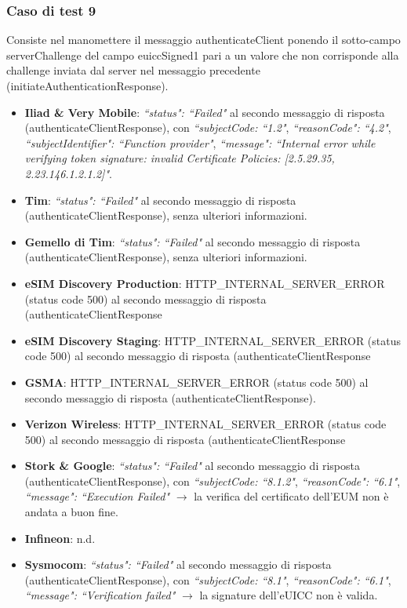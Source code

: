 \documentclass[10pt, oneside]{book}
\begin{document}
\subsubsection{Caso di test 9}
Consiste nel manomettere il messaggio authenticateClient ponendo il sotto-campo serverChallenge del campo euiccSigned1 pari a un valore che non corrisponde alla challenge inviata dal server nel messaggio precedente (initiateAuthenticationResponse).
\begin{itemize}
\item \textbf{Iliad \& Very Mobile}: \textit{``status": ``Failed"} al secondo messaggio di risposta (authenticateClientResponse), con \textit{``subjectCode: ``1.2"}, \textit{``reasonCode": ``4.2"}, \textit{``subjectIdentifier": ``Function provider"}, \textit{``message": ``Internal error while verifying token signature: invalid Certificate Policies: [2.5.29.35, 2.23.146.1.2.1.2]"}.
\item \textbf{Tim}: \textit{``status": ``Failed"} al secondo messaggio di risposta (authenticateClientResponse), senza ulteriori informazioni.
\item \textbf{Gemello di Tim}: \textit{``status": ``Failed"} al secondo messaggio di risposta (authenticateClientResponse), senza ulteriori informazioni.
\item \textbf{eSIM Discovery Production}: HTTP\_INTERNAL\_SERVER\_ERROR (status code 500) al secondo messaggio di risposta (authenticateClientResponse
\item \textbf{eSIM Discovery Staging}: HTTP\_INTERNAL\_SERVER\_ERROR (status code 500) al secondo messaggio di risposta (authenticateClientResponse
\item \textbf{GSMA}: HTTP\_INTERNAL\_SERVER\_ERROR (status code 500) al secondo messaggio di risposta (authenticateClientResponse).
\item \textbf{Verizon Wireless}: HTTP\_INTERNAL\_SERVER\_ERROR (status code 500) al secondo messaggio di risposta (authenticateClientResponse
\item \textbf{Stork \& Google}: \textit{``status": ``Failed"} al secondo messaggio di risposta (authenticateClientResponse), con \textit{``subjectCode: ``8.1.2"}, \textit{``reasonCode": ``6.1"}, \textit{``message": ``Execution Failed"} $\rightarrow$ la verifica del certificato dell'EUM non è andata a buon fine.
\item \textbf{Infineon}: n.d.
\item \textbf{Sysmocom}: \textit{``status": ``Failed"} al secondo messaggio di risposta (authenticateClientResponse), con \textit{``subjectCode: ``8.1"}, \textit{``reasonCode": ``6.1"}, \textit{``message": ``Verification failed"} $\rightarrow$ la signature dell'eUICC non è valida.

\end{itemize}
\end{document}
